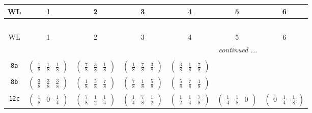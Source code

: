 \documentclass[fleqn,9pt,landscape]{jsarticle}
\begin{document}
\begin{center}
\renewcommand{\arraystretch}{1.2}
\begin{longtable}{ccccccc}
 \hline \hline
WL & 1 & 2 & 3 & 4 & 5 & 6 \\ \hline \endfirsthead

\multicolumn{6}{l}{\tablename\ \thetable{}} \\
 \hline \hline
WL & 1 & 2 & 3 & 4 & 5 & 6 \\ \hline \endhead

 \hline \hline
\multicolumn{6}{r}{\footnotesize\it continued ...} \\ \endfoot

 \hline \hline
\multicolumn{6}{r}{} \\ \endlastfoot

{\tt 8a} & $ \begin{pmatrix} \frac{1}{8} & \frac{1}{8} & \frac{1}{8} \end{pmatrix} $ & $ \begin{pmatrix} \frac{7}{8} & \frac{3}{8} & \frac{1}{8} \end{pmatrix} $ & $ \begin{pmatrix} \frac{1}{8} & \frac{7}{8} & \frac{3}{8} \end{pmatrix} $ & $ \begin{pmatrix} \frac{3}{8} & \frac{1}{8} & \frac{7}{8} \end{pmatrix} $ & $  $ & $  $ \\ \hline
{\tt 8b} & $ \begin{pmatrix} \frac{3}{8} & \frac{3}{8} & \frac{3}{8} \end{pmatrix} $ & $ \begin{pmatrix} \frac{1}{8} & \frac{5}{8} & \frac{7}{8} \end{pmatrix} $ & $ \begin{pmatrix} \frac{7}{8} & \frac{1}{8} & \frac{5}{8} \end{pmatrix} $ & $ \begin{pmatrix} \frac{5}{8} & \frac{7}{8} & \frac{1}{8} \end{pmatrix} $ & $  $ & $  $ \\ \hline
{\tt 12c} & $ \begin{pmatrix} \frac{1}{8} & 0 & \frac{1}{4} \end{pmatrix} $ & $ \begin{pmatrix} \frac{7}{8} & \frac{1}{2} & \frac{1}{4} \end{pmatrix} $ & $ \begin{pmatrix} \frac{1}{4} & \frac{7}{8} & \frac{1}{2} \end{pmatrix} $ & $ \begin{pmatrix} \frac{1}{2} & \frac{1}{4} & \frac{7}{8} \end{pmatrix} $ & $ \begin{pmatrix} \frac{1}{4} & \frac{1}{8} & 0 \end{pmatrix} $ & $ \begin{pmatrix} 0 & \frac{1}{4} & \frac{1}{8} \end{pmatrix} $ \\ \hline

\end{longtable}
\end{center}
\end{document}
